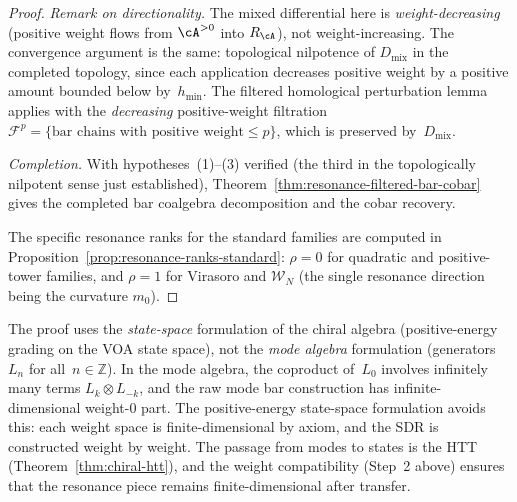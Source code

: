 \begin{proof}
\emph{Remark on directionality.}  The mixed differential
here is \emph{weight-decreasing} (positive weight flows from
$\cA^{>0}$ into $R_\cA$), not weight-increasing.  The
convergence argument is the same: topological nilpotence of
$D_{\mathrm{mix}}$ in the completed topology, since each
application decreases positive weight by a positive amount
bounded below by~$h_{\min}$.  The
filtered homological perturbation lemma applies with the
\emph{decreasing} positive-weight filtration
$\mathcal{F}^p = \{\text{bar chains with positive weight}
\le p\}$, which is preserved by~$D_{\mathrm{mix}}$.

\emph{Completion.}
With hypotheses~(1)--(3) verified (the third in the
topologically nilpotent sense just established),
Theorem~\ref{thm:resonance-filtered-bar-cobar} gives the
completed bar coalgebra decomposition and the cobar recovery.

The specific resonance ranks for the standard families are
computed in Proposition~\ref{prop:resonance-ranks-standard}:
$\rho = 0$ for quadratic and positive-tower families, and
$\rho = 1$ for Virasoro and $\mathcal{W}_N$
(the single resonance direction being the curvature $m_0$).
\end{proof}

\begin{remark}
\label{rem:mode-vs-state-completion}
The proof uses the \emph{state-space} formulation of the
chiral algebra (positive-energy grading on the VOA state space),
not the \emph{mode algebra} formulation (generators $L_n$ for
all~$n \in \mathbb{Z}$).  In the mode algebra, the coproduct
of~$L_0$ involves infinitely many terms
$L_k \otimes L_{-k}$, and the raw mode bar construction has
infinite-dimensional weight-$0$ part.  The positive-energy
state-space formulation avoids this: each weight space is
finite-dimensional by axiom, and the SDR is constructed weight by
weight.  The passage from modes to states is the HTT
(Theorem~\ref{thm:chiral-htt}), and the weight compatibility
(Step~2 above) ensures that the resonance piece remains
finite-dimensional after transfer.
\end{remark}

